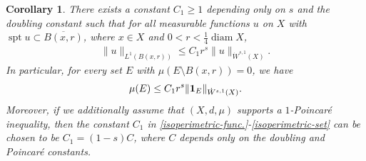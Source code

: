 \documentclass[11pt,leqno]{amsart}
\newtheorem{corollary}[theorem]{Corollary}
\numberwithin{equation}{section}
\theoremstyle{definition}
\DeclareMathOperator{\diam}{diam}
\DeclareMathOperator{\supp}{spt}
\begin{document}
	\begin{corollary}
		There exists a constant $C_1\ge 1$ depending only on $s$ and the
		doubling constant such that for all measurable functions $u$ on $X$ with
		$\supp u \subset \overline{B(x,r)}$,
		where  $x\in X$ and  $0<r<\frac{1}{4}\diam X$, 
		\begin{align}\label{isoperimetric-func.}
			\|u\|_{L^1(B(x,r))} \leq C_1 r^s \|u\|_{\dot W^{s,1}(X)}.
		\end{align}
		In particular, for every set $E$ with  $\mu(E\setminus B(x,r))=0$, we have
		\begin{align}\label{isoperimetric-set}
			\mu(E)\leq C_1 r^s \|{\bf 1}_E\|_{\dot W^{s,1}(X)}.
		\end{align}
		Moreover, if we additionally assume that $(X,d,\mu)$ supports a $1$-Poincar\'e inequality, then the constant $C_1$ in \eqref{isoperimetric-func.}-\eqref{isoperimetric-set} can be chosen to be $C_1=(1-s)C$, where $C$ 
		depends only on the doubling and Poincar\'e constants. 
	\end{corollary}
\end{document}
